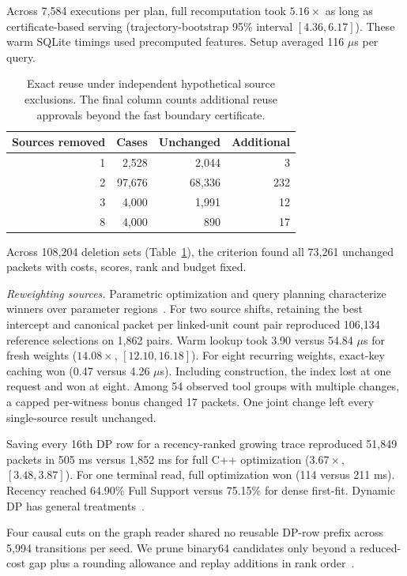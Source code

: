 \documentclass[conference]{IEEEtran}
\begin{document}
Across 7,584 executions per plan, full recomputation took $5.16\times$ as long as certificate-based serving (trajectory-bootstrap 95\% interval $[4.36,6.17]$). These warm SQLite timings used precomputed features. Setup averaged 116 $\mu$s per query. 

\balance
\begin{table}[t]
\caption{Exact reuse under independent hypothetical source exclusions. The final column counts additional reuse approvals beyond the fast boundary certificate.}
\centering\small
\begin{tabular}{rrrr}\toprule
Sources removed & Cases & Unchanged & Additional\\\midrule
1 & 2,528 & 2,044 & 3\\
2 & 97,676 & 68,336 & 232\\
3 & 4,000 & 1,991 & 12\\
8 & 4,000 & 890 & 17\\
\bottomrule\end{tabular}
\label{tab:exclusions}
\end{table}

Across 108,204 deletion sets (Table~\ref{tab:exclusions}), the criterion found all 73,261 unchanged packets with costs, scores, rank and budget fixed.

\noindent\textit{Reweighting sources.} Parametric optimization and query planning characterize winners over parameter regions~\cite{crema,ganguly,eisner}. For two source shifts, retaining the best intercept and canonical packet per linked-unit count pair reproduced 106,134 reference selections on 1,862 pairs. Warm lookup took 3.90 versus 54.84 $\mu$s for fresh weights ($14.08\times$, $[12.10,16.18]$). For eight recurring weights, exact-key caching won (0.47 versus 4.26 $\mu$s). Including construction, the index lost at one request and won at eight. Among 54 observed tool groups with multiple changes, a capped per-witness bonus changed 17 packets. One joint change left every single-source result unchanged.

Saving every 16th DP row for a recency-ranked growing trace reproduced 51,849 packets in 505 ms versus 1,852 ms for full C++ optimization ($3.67\times$, $[3.48,3.87]$). For one terminal read, full optimization won (114 versus 211 ms). Recency reached 64.90\% Full Support versus 75.15\% for dense first-fit. Dynamic DP has general treatments~\cite{dynamicdp}.

Four causal cuts on the graph reader shared no reusable DP-row prefix across 5,994 transitions per seed. We prune binary64 candidates only beyond a reduced-cost gap plus a rounding allowance and replay additions in rank order~\cite{coreknap}.
\end{document}
